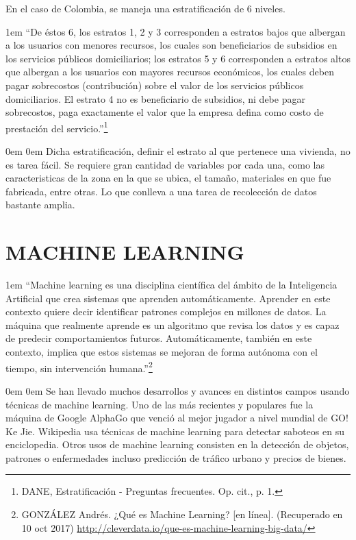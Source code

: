     En el caso de Colombia, se maneja una estratificación de 6 niveles.

	\leftskip1em
	\rightskip\leftskip
	{\footnotesize \hspace{\parindent} “De éstos 6, los estratos 1, 2 y 3 corresponden a estratos bajos que albergan a los usuarios con menores recursos, los cuales son beneficiarios de subsidios en los servicios públicos domiciliarios; los estratos 5 y 6 corresponden a estratos altos que albergan a los usuarios con mayores recursos económicos, los cuales deben pagar sobrecostos (contribución) sobre el valor de los servicios públicos domiciliarios. El estrato 4 no es beneficiario de subsidios, ni debe pagar sobrecostos, paga exactamente el valor que la empresa defina como costo de prestación del servicio.”\footnote[9]{DANE, Estratificación - Preguntas frecuentes. Op. cit., p. 1.}}
	
	\leftskip0em
	\rightskip0em
    Dicha estratificación, definir el estrato al que pertenece una vivienda, no es tarea fácil. Se requiere gran cantidad de variables por cada una, como las caracteristicas de la zona en la que se ubica, el tamaño, materiales en que fue fabricada, entre otras. Lo que conlleva a una tarea de recolección de datos bastante amplia.
    
    
    \section{MACHINE LEARNING}
    
    \leftskip1em
    \rightskip\leftskip
    {\footnotesize \hspace{\parindent}
    “Machine learning es una disciplina científica del ámbito de la Inteligencia Artificial que crea sistemas que aprenden automáticamente. Aprender en este contexto quiere decir identificar patrones complejos en millones de datos. La máquina que realmente aprende es un algoritmo que revisa los datos y es capaz de predecir comportamientos futuros. Automáticamente, también en este contexto, implica que estos sistemas se mejoran de forma autónoma con el tiempo, sin intervención humana.”\footnote[10]{GONZÁLEZ  Andrés. ¿Qué es Machine Learning? [en línea]. (Recuperado en 10 oct 2017) \url{http://cleverdata.io/que-es-machine-learning-big-data/}}}

    \leftskip0em
    \rightskip0em
    Se han llevado muchos desarrollos y avances en distintos campos usando técnicas de machine learning. Uno de las más recientes y populares fue la máquina de Google AlphaGo que venció al mejor jugador a nivel mundial de GO! Ke Jie. 
    Wikipedia usa técnicas de machine learning para detectar saboteos en su enciclopedia. Otros usos de machine learning consisten en la detección de objetos, patrones o enfermedades incluso predicción de tráfico urbano y precios de bienes.
    
